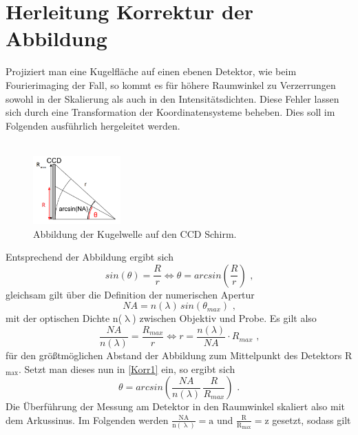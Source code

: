 \section{Herleitung Korrektur der Abbildung}
\label{correct}
Projiziert man eine Kugelfläche auf einen ebenen Detektor, wie beim Fourierimaging der Fall, so kommt es für höhere Raumwinkel zu Verzerrungen sowohl in der Skalierung als auch in den Intensitätsdichten. Diese Fehler lassen sich durch eine Transformation der Koordinatensysteme beheben. Dies soll im Folgenden ausführlich hergeleitet werden.
\\
\\
\begin{figure}[h]
\centering
\includegraphics[width=0.3\textwidth]{Bilder/Anhang/arcsin}
\caption[Fourier-Korrektur]{Abbildung der Kugelwelle auf den CCD Schirm.}
\end{figure}
Entsprechend der Abbildung ergibt sich
\begin{equation}
sin(\theta)=\frac{R}{r} \Longleftrightarrow \theta = arcsin\left(\frac{R}{r}\right) \text{ ,}
\label{Korr1}
\end{equation} 
gleichsam gilt über die Definition der numerischen Apertur
\begin{equation}
NA=n(\lambda) \, sin(\theta_{max}) \text{ ,}
\end{equation}
mit der optischen Dichte n($\uplambda$) zwischen Objektiv und Probe. Es gilt also
\begin{equation}
\frac{NA}{n(\lambda)}=\frac{R_{max}}{r} \Longleftrightarrow r=\frac{n(\lambda)}{NA} \cdot R_{max} \text{ ,}
\end{equation} für den größtmöglichen Abstand der Abbildung zum Mittelpunkt des Detektors R$_\text{max}$. Setzt man dieses nun in \autoref{Korr1} ein, so ergibt sich
\begin{equation}
\theta=arcsin\left(\frac{NA}{n(\lambda)}\, \frac{R}{R_{max}}\right)\text{ .}
\label{Korr4}
\end{equation}
Die Überführung der Messung am Detektor in den Raumwinkel skaliert also mit dem Arkussinus. Im Folgenden werden $\frac{\text{NA}}{\text{n}(\uplambda)}=\text{a}$ und $\frac{\text{R}}{\text{R}_\text{max}}=\text{z}$ gesetzt, sodass gilt
